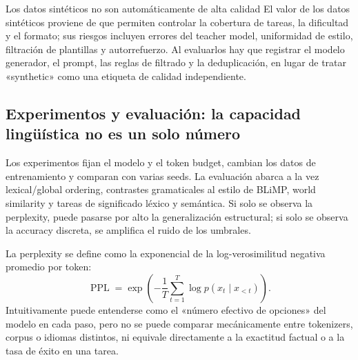 


\begin{knowledgebox}{Los datos sintéticos no son automáticamente de alta calidad}
El valor de los datos sintéticos proviene de que permiten controlar la cobertura de tareas, la dificultad y el formato; sus riesgos incluyen errores del teacher model, uniformidad de estilo, filtración de plantillas y autorrefuerzo. Al evaluarlos hay que registrar el modelo generador, el prompt, las reglas de filtrado y la deduplicación, en lugar de tratar «synthetic» como una etiqueta de calidad independiente.
\end{knowledgebox}

\subsection{Experimentos y evaluación: la capacidad lingüística no es un solo número}

Los experimentos fijan el modelo y el token budget, cambian los datos de entrenamiento y comparan con varias seeds. La evaluación abarca a la vez lexical/global ordering, contrastes gramaticales al estilo de BLiMP, world similarity y tareas de significado léxico y semántica. Si solo se observa la perplexity, puede pasarse por alto la generalización estructural; si solo se observa la accuracy discreta, se amplifica el ruido de los umbrales.





La perplexity se define como la exponencial de la log-verosimilitud negativa promedio por token:
\[
\operatorname{PPL}=\exp\!\left(-\frac{1}{T}\sum_{t=1}^{T}\log p(x_t\mid x_{<t})\right).
\]
Intuitivamente puede entenderse como el «número efectivo de opciones» del modelo en cada paso, pero no se puede comparar mecánicamente entre tokenizers, corpus o idiomas distintos, ni equivale directamente a la exactitud factual o a la tasa de éxito en una tarea.


